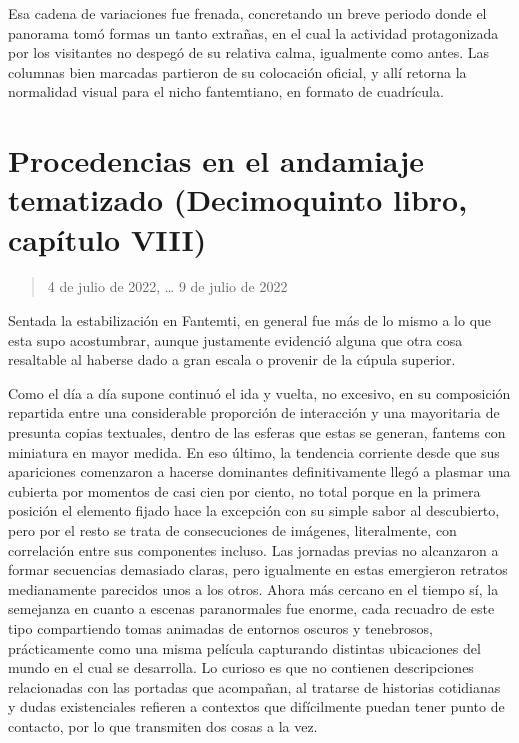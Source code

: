 \documentclass[
]{book}
\begin{document}
Esa cadena de variaciones fue frenada, concretando un breve periodo donde el panorama tomó formas un tanto extrañas, en el cual la actividad protagonizada por los visitantes no despegó de su relativa calma, igualmente como antes. Las columnas bien marcadas partieron de su colocación oficial, y allí retorna la normalidad visual para el nicho fantemtiano, en formato de cuadrícula.

\hypertarget{procedencias-en-el-andamiaje-tematizado-decimoquinto-libro-capuxedtulo-viii}{%
\section{Procedencias en el andamiaje tematizado (Decimoquinto libro, capítulo VIII)}\label{procedencias-en-el-andamiaje-tematizado-decimoquinto-libro-capuxedtulo-viii}}

\begin{quote}
4 de julio de 2022, \ldots{} 9 de julio de 2022
\end{quote}

Sentada la estabilización en Fantemti, en general fue más de lo mismo a lo que esta supo acostumbrar, aunque justamente evidenció alguna que otra cosa resaltable al haberse dado a gran escala o provenir de la cúpula superior.

Como el día a día supone continuó el ida y vuelta, no excesivo, en su composición repartida entre una considerable proporción de interacción y una mayoritaria de presunta copias textuales, dentro de las esferas que estas se generan, fantems con miniatura en mayor medida. En eso último, la tendencia corriente desde que sus apariciones comenzaron a hacerse dominantes definitivamente llegó a plasmar una cubierta por momentos de casi cien por ciento, no total porque en la primera posición el elemento fijado hace la excepción con su simple sabor al descubierto, pero por el resto se trata de consecuciones de imágenes, literalmente, con correlación entre sus componentes incluso. Las jornadas previas no alcanzaron a formar secuencias demasiado claras, pero igualmente en estas emergieron retratos medianamente parecidos unos a los otros. Ahora más cercano en el tiempo sí, la semejanza en cuanto a escenas paranormales fue enorme, cada recuadro de este tipo compartiendo tomas animadas de entornos oscuros y tenebrosos, prácticamente como una misma película capturando distintas ubicaciones del mundo en el cual se desarrolla. Lo curioso es que no contienen descripciones relacionadas con las portadas que acompañan, al tratarse de historias cotidianas y dudas existenciales refieren a contextos que difícilmente puedan tener punto de contacto, por lo que transmiten dos cosas a la vez.
\end{document}
